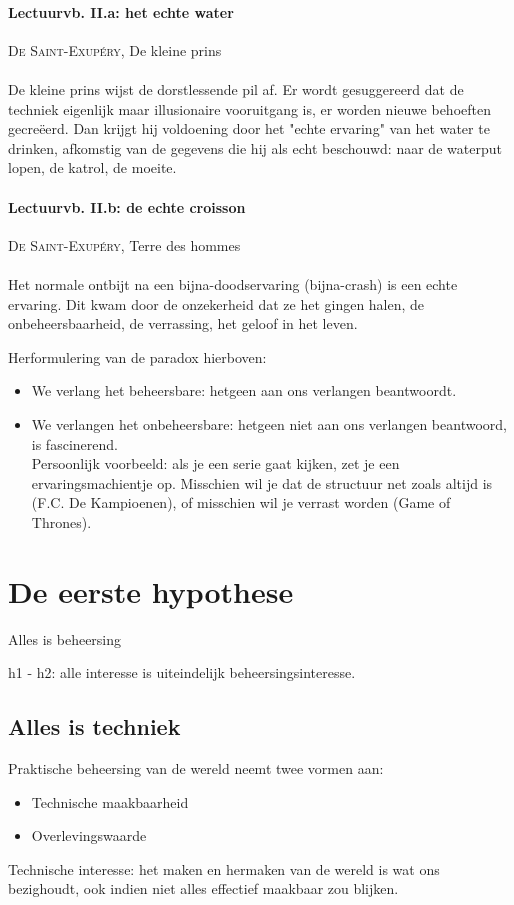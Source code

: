 \paragraph{Lectuurvb. II.a: het echte water} \textsc{De Saint-Exup\'ery}, De kleine prins
\\ \\
De kleine prins wijst de dorstlessende pil af. Er wordt gesuggereerd dat de techniek eigenlijk maar illusionaire vooruitgang is, er worden nieuwe behoeften gecre\"eerd. Dan krijgt hij voldoening door het "echte ervaring" van het water te drinken, afkomstig van de gegevens die hij als echt beschouwd: naar de waterput lopen, de katrol, de moeite.

\paragraph{Lectuurvb. II.b: de echte croisson} \textsc{De Saint-Exup\'ery}, Terre des hommes
\\ \\
Het normale ontbijt na een bijna-doodservaring (bijna-crash) is een echte ervaring. Dit kwam door de onzekerheid dat ze het gingen halen, de onbeheersbaarheid, de verrassing, het geloof in het leven.

Herformulering van de paradox hierboven:

\begin{itemize}
	\item We verlang het beheersbare: hetgeen aan ons verlangen beantwoordt. 
	\item We verlangen het onbeheersbare: hetgeen niet aan ons verlangen beantwoord, is fascinerend.
	\\ Persoonlijk voorbeeld: als je een serie gaat kijken, zet je een ervaringsmachientje op. Misschien wil je dat de structuur net zoals altijd is (F.C. De Kampioenen), of misschien wil je verrast worden (Game of Thrones).
\end{itemize}

\section{De eerste hypothese}
\begin{center}
\begin{huge}
Alles is beheersing
\end{huge}
\end{center}
h1 - h2: alle interesse is uiteindelijk beheersingsinteresse.

\subsection{Alles is techniek}
Praktische beheersing van de wereld neemt twee vormen aan:
\begin{itemize}
\item Technische maakbaarheid
\item Overlevingswaarde
\end{itemize}
Technische interesse: het maken en hermaken van de wereld is wat ons bezighoudt, ook indien niet alles effectief maakbaar zou blijken.
